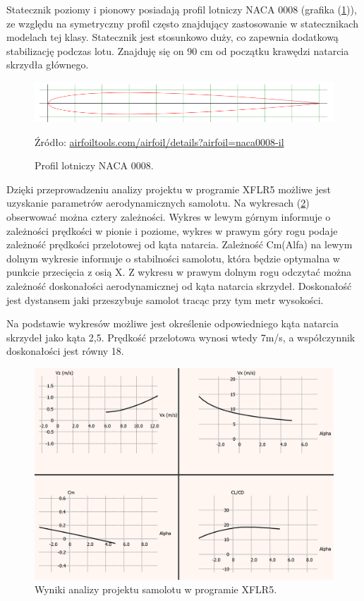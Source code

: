 \documentclass[12pt, a4paper]{article}
\let\oldref\ref
\renewcommand{\ref}[1]{(\oldref{#1})}
\begin{document}
Statecznik poziomy i pionowy posiadają profil lotniczy NACA 0008 (grafika \ref{fig:naca}), ze względu na symetryczny profil często znajdujący zastosowanie w statecznikach modelach tej klasy. Statecznik jest stosunkowo duży, co zapewnia dodatkową stabilizację podczas lotu. Znajduję się on 90 cm od początku krawędzi natarcia skrzydła głównego.

 \begin{figure}[ht]
    \centering
    \includegraphics[width=1\textwidth]{naca0008}
    \caption{Profil lotniczy NACA 0008.}
    \small Źródło: \url{airfoiltools.com/airfoil/details?airfoil=naca0008-il}
    \label{fig:naca}
\end{figure}

Dzięki przeprowadzeniu analizy projektu w programie XFLR5 możliwe jest uzyskanie parametrów aerodynamicznych samolotu. Na wykresach \ref{fig:wykresy} obserwować można cztery zależności. Wykres w lewym górnym informuje o zależności prędkości w pionie i poziome, wykres w prawym góry rogu podaje zależność prędkości przelotowej od kąta natarcia. Zależność Cm(Alfa) na lewym dolnym wykresie informuje o stabilności samolotu, która będzie optymalna w punkcie przecięcia z osią X. Z wykresu w prawym dolnym rogu odczytać można zależność doskonałości aerodynamicznej od kąta natarcia skrzydeł. Doskonałość jest dystansem jaki przeszybuje samolot tracąc przy tym metr wysokości. 

Na podstawie wykresów możliwe jest określenie odpowiedniego kąta natarcia skrzydeł jako kąta 2,5\textdegree. Prędkość przelotowa wynosi wtedy 7m/s, a współczynnik doskonałości jest równy 18.

\begin{figure}[ht]
    \centering
    \includegraphics[width=1\textwidth]{wykresy}
    \caption{Wyniki analizy projektu samolotu w programie XFLR5.}
    \label{fig:wykresy}
\end{figure}
\end{document}
